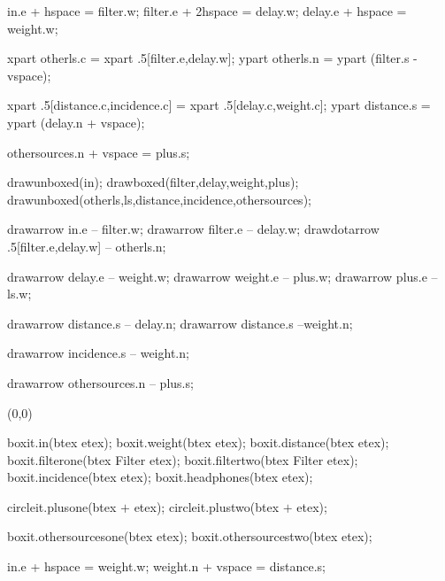\documentclass[a4paper]{article}
\begin{document}
\begin{empfile}
\begin{empdef}[wfs]
in.e + hspace = filter.w;
filter.e + 2hspace = delay.w;
delay.e + hspace = weight.w;

xpart otherls.c = xpart .5[filter.e,delay.w];
ypart otherls.n = ypart (filter.s - vspace);


xpart .5[distance.c,incidence.c] = xpart .5[delay.c,weight.c];
ypart distance.s = ypart (delay.n + vspace);


othersources.n + vspace = plus.s;

drawunboxed(in);
drawboxed(filter,delay,weight,plus);
drawunboxed(otherls,ls,distance,incidence,othersources);

drawarrow in.e -- filter.w;
drawarrow filter.e -- delay.w;
drawdotarrow .5[filter.e,delay.w] -- otherls.n;

drawarrow delay.e -- weight.w;
drawarrow weight.e -- plus.w;
drawarrow plus.e -- ls.w;

drawarrow distance.s -- delay.n;
drawarrow distance.s --weight.n;

drawarrow incidence.s -- weight.n;

drawarrow othersources.n -- plus.s;

\end{empdef}

\begin{empdef}[binaural2](0,0)

boxit.in(btex  etex);
boxit.weight(btex  etex);
boxit.distance(btex  etex);
boxit.filterone(btex Filter etex);
boxit.filtertwo(btex Filter etex);
boxit.incidence(btex  etex);
boxit.headphones(btex  etex);

circleit.plusone(btex $+$ etex);
circleit.plustwo(btex $+$ etex);

boxit.othersourcesone(btex  etex);
boxit.othersourcestwo(btex  etex);

in.e + hspace = weight.w;
weight.n + vspace = distance.s;


\end{empdef}
\end{empfile}
\end{document}
